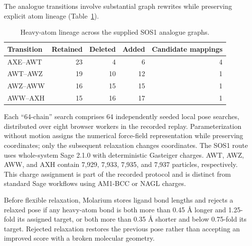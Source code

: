 \documentclass[11pt]{article}
\begin{document}
\begin{small}
The analogue transitions involve substantial graph rewrites while preserving explicit atom lineage (Table~\ref{tab:appA_lineage}).

\begin{table}[htbp]
\centering\small
\caption{Heavy-atom lineage across the supplied SOS1 analogue graphs.}
\label{tab:appA_lineage}
\begin{tabular}{@{}lrrrr@{}}
\toprule
\textbf{Transition} & \textbf{Retained} & \textbf{Deleted} & \textbf{Added} & \textbf{Candidate mappings}\\
\midrule
AXE--AWT & 23 & 4 & 6 & 4\\
AWT--AWZ & 19 & 10 & 12 & 1\\
AWZ--AWW & 16 & 15 & 15 & 1\\
AWW--AXH & 15 & 16 & 17 & 1\\
\bottomrule
\end{tabular}
\end{table}

Each ``64-chain'' search comprises 64 independently seeded local pose searches, distributed over eight browser workers in the recorded replay. Parameterization without motion assigns the numerical force-field representation while preserving coordinates; only the subsequent relaxation changes coordinates. The SOS1 route uses whole-system Sage 2.1.0 with deterministic Gasteiger charges. AWT, AWZ, AWW, and AXH contain 7,929, 7,933, 7,935, and 7,937 particles, respectively. This charge assignment is part of the recorded protocol and is distinct from standard Sage workflows using AM1-BCC or NAGL charges.

Before flexible relaxation, Molarium stores ligand bond lengths and rejects a relaxed pose if any heavy-atom bond is both more than 0.45 \AA{} longer and 1.25-fold its assigned target, or both more than 0.35 \AA{} shorter and below 0.75-fold its target. Rejected relaxation restores the previous pose rather than accepting an improved score with a broken molecular geometry.


\end{small}
\end{document}
